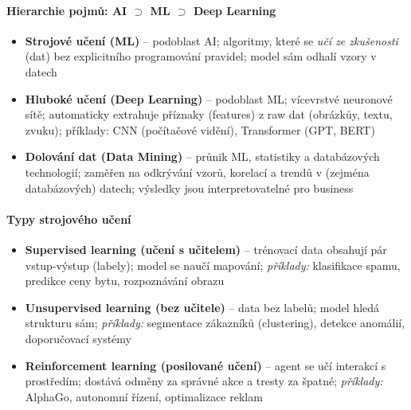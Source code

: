 \paragraph{Hierarchie pojmů: AI $\supset$ ML $\supset$ Deep Learning}

\begin{center}
\end{center}

\begin{itemize}
  \item \textbf{Strojové učení (ML)} -- podoblast AI; algoritmy, které se \textit{učí ze zkušenosti}
    (dat) bez explicitního programování pravidel; model sám odhalí vzory v datech
  \item \textbf{Hluboké učení (Deep Learning)} -- podoblast ML; vícevrstvé neuronové sítě;
    automaticky extrahuje příznaky (features) z raw dat (obrázkůy, textu, zvuku);
    příklady: CNN (počítačové vidění), Transformer (GPT, BERT)
  \item \textbf{Dolování dat (Data Mining)} -- průnik ML, statistiky a databázových technologií;
    zaměřen na odkrývání vzorů, korelací a trendů v (zejména databázových) datech;
    výsledky jsou interpretovatelné pro business
\end{itemize}

\paragraph{Typy strojového učení}
\begin{itemize}
  \item \textbf{Supervised learning (učení s učitelem)} -- trénovací data obsahují pár vstup-výstup
    (labely); model se naučí mapování; \textit{příklady:} klasifikace spamu, predikce ceny bytu,
    rozpoznávání obrazu
  \item \textbf{Unsupervised learning (bez učitele)} -- data bez labelů; model hledá strukturu sám;
    \textit{příklady:} segmentace zákazníků (clustering), detekce anomálií, doporučovací systémy
  \item \textbf{Reinforcement learning (posilované učení)} -- agent se učí interakcí s prostředím;
    dostává odměny za správné akce a tresty za špatné; \textit{příklady:} AlphaGo, autonomní řízení,
    optimalizace reklam
\end{itemize}

